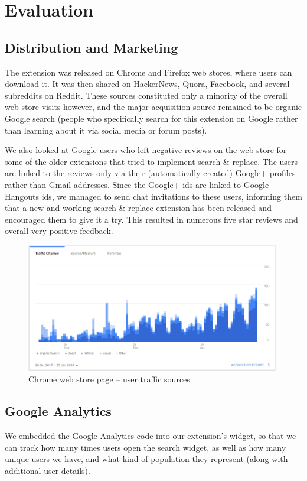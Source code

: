 \documentclass[bsc,frontabs,twoside,singlespacing,parskip,deptreport]{infthesis}
\begin{document}
\chapter{Evaluation}
\section{Distribution and Marketing}
The extension was released on Chrome and Firefox web stores, where users can download it. It was then shared on HackerNews, Quora, Facebook, and several subreddits on Reddit. These sources constituted only a minority of the overall web store visits however, and the major acquisition source remained to be organic Google search (people who specifically search for this extension on Google rather than learning about it via social media or forum posts).

We also looked at Google users who left negative reviews on the web store for some of the older extensions that tried to implement search \& replace. The users are linked to the reviews only via their (automatically created) Google+ profiles rather than Gmail addresses. Since the Google+ ids are linked to Google Hangouts ids, we managed to send chat invitations to these users, informing them that a new and working search \& replace extension has been released and encouraged them to give it a try. This resulted in numerous five star reviews and overall very positive feedback.

\begin{figure}[h]
\centering
\includegraphics[width=0.99\textwidth]{../docs/user-acquisition.png}
\caption{Chrome web store page -- user traffic sources}
\end{figure}

\section{Google Analytics}
We embedded the Google Analytics code into our extension's widget, so that we can track how many times users open the search widget, as well as how many unique users we have, and what kind of population they represent (along with additional user details).
\end{document}

